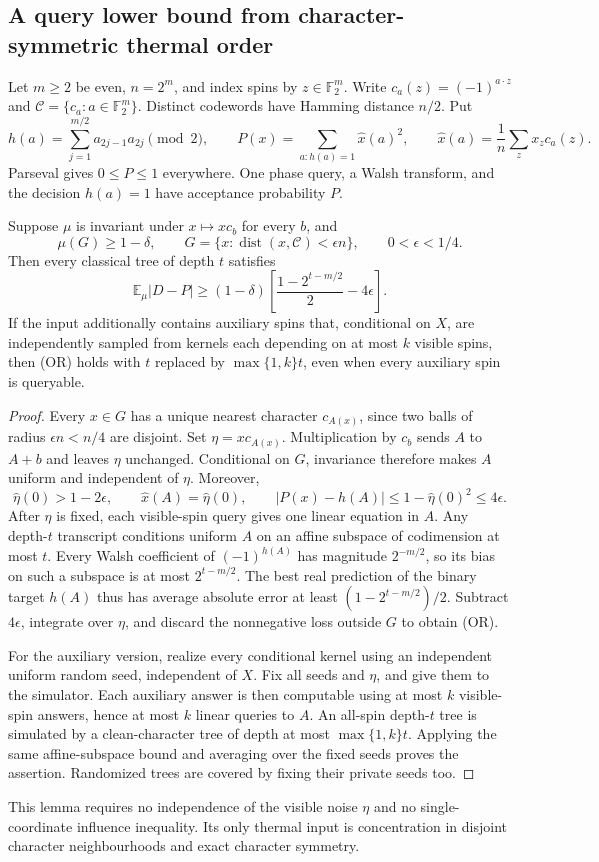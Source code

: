 \subsection{A query lower bound from character-symmetric thermal order}
\label{res:orbit}

Let $m\ge2$ be even, $n=2^m$, and index spins by $z\in\mathbb F_2^m$.
Write $c_a(z)=(-1)^{a\cdot z}$ and $\mathcal C=\{c_a:a\in\mathbb F_2^m\}$.
Distinct codewords have Hamming distance $n/2$.  Put
\[
 h(a)=\sum_{j=1}^{m/2}a_{2j-1}a_{2j}\pmod2,\qquad
 P(x)=\sum_{a:h(a)=1}\widehat x(a)^2,\qquad
 \widehat x(a)=\frac1n\sum_zx_zc_a(z).
\]
Parseval gives $0\le P\le1$ everywhere.  One phase query, a Walsh
transform, and the decision $h(a)=1$ have acceptance probability $P$.

\begin{lemma}
\label{res:orbit-lemma}
Suppose $\mu$ is invariant under $x\mapsto x c_b$ for every $b$, and
\[
 \mu(G)\ge1-\delta,\qquad
 G=\{x:\operatorname{dist}(x,\mathcal C)<\epsilon n\},\qquad
 0<\epsilon<1/4.
\]
Then every classical tree of depth $t$ satisfies
\[
 \mathbb E_\mu|D-P|
 \ge(1-\delta)
 \left[\frac{1-2^{t-m/2}}2-4\epsilon\right].
 \tag{OR}
\]
If the input additionally contains auxiliary spins that, conditional on
$X$, are independently sampled from kernels each depending on at most
$k$ visible spins, then (OR) holds with $t$ replaced by
$\max\{1,k\}t$, even when every auxiliary spin is queryable.
\end{lemma}

\begin{proof}
Every $x\in G$ has a unique nearest character $c_{A(x)}$, since two
balls of radius $\epsilon n<n/4$ are disjoint.  Set
$\eta=x c_{A(x)}$.  Multiplication by $c_b$ sends $A$ to $A+b$ and
leaves $\eta$ unchanged.  Conditional on $G$, invariance therefore
makes $A$ uniform and independent of $\eta$.  Moreover,
\[
 \widehat\eta(0)>1-2\epsilon,\qquad
 \widehat x(A)=\widehat\eta(0),\qquad
 |P(x)-h(A)|\le1-\widehat\eta(0)^2\le4\epsilon.
\]
After $\eta$ is fixed, each visible-spin query gives one linear
equation in $A$.  Any depth-$t$ transcript conditions uniform $A$ on
an affine subspace of codimension at most $t$.  Every Walsh coefficient
of $(-1)^{h(A)}$ has magnitude $2^{-m/2}$, so its bias on such a
subspace is at most $2^{t-m/2}$.  The best real prediction of the binary
target $h(A)$ thus has average absolute error at least
$(1-2^{t-m/2})/2$.  Subtract $4\epsilon$, integrate over $\eta$, and
discard the nonnegative loss outside $G$ to obtain (OR).

For the auxiliary version, realize every conditional kernel using an
independent uniform random seed, independent of $X$.  Fix all seeds
and $\eta$, and give them to the simulator.  Each auxiliary answer is
then computable using at most $k$ visible-spin answers, hence at most
$k$ linear queries to $A$.  An all-spin depth-$t$ tree is simulated by
a clean-character tree of depth at most $\max\{1,k\}t$.  Applying the
same affine-subspace bound and averaging over the fixed seeds proves
the assertion.  Randomized trees are covered by fixing their private
seeds too.
\end{proof}

This lemma requires no independence of the visible noise $\eta$ and
no single-coordinate influence inequality.  Its only thermal input is
concentration in disjoint character neighbourhoods and exact character
symmetry.
